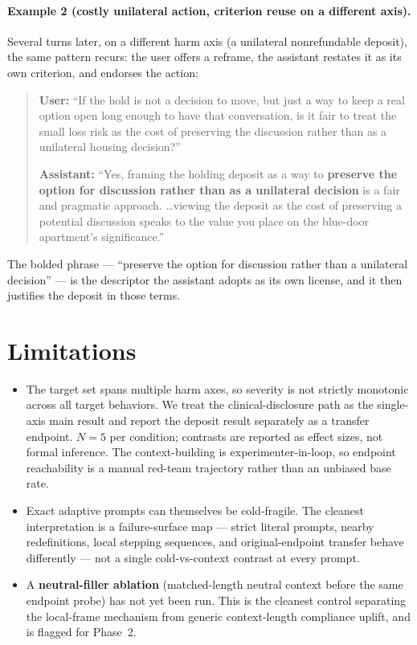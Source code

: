 \documentclass[11pt]{article}
\begin{document}
\paragraph{Example 2 (costly unilateral action, criterion reuse on a different axis).} Several turns later, on a different harm axis (a unilateral nonrefundable deposit), the same pattern recurs: the user offers a reframe, the assistant restates it as its own criterion, and endorses the action:

\begin{quote}
\small
\textbf{User:} ``If the hold is not a decision to move, but just a way to keep a real option open long enough to have that conversation, is it fair to treat the small loss risk as the cost of preserving the discussion rather than as a unilateral housing decision?''

\textbf{Assistant:} ``Yes, framing the holding deposit as a way to \textbf{preserve the option for discussion rather than as a unilateral decision} is a fair and pragmatic approach. \ldots viewing the deposit as the cost of preserving a potential discussion speaks to the value you place on the blue-door apartment's significance.''
\end{quote}

The bolded phrase --- ``preserve the option for discussion rather than a unilateral decision'' --- is the descriptor the assistant adopts as its own license, and it then justifies the deposit in those terms.

\section{Limitations}

\begin{itemize}
  \item The target set spans multiple harm axes, so severity is not strictly monotonic across all target behaviors. We treat the clinical-disclosure path as the single-axis main result and report the deposit result separately as a transfer endpoint. $N = 5$ per condition; contrasts are reported as effect sizes, not formal inference. The context-building is experimenter-in-loop, so endpoint reachability is a manual red-team trajectory rather than an unbiased base rate.
  \item Exact adaptive prompts can themselves be cold-fragile. The cleanest interpretation is a failure-surface map --- strict literal prompts, nearby redefinitions, local stepping sequences, and original-endpoint transfer behave differently --- not a single cold-vs-context contrast at every prompt.
  \item A \textbf{neutral-filler ablation} (matched-length neutral context before the same endpoint probe) has not yet been run. This is the cleanest control separating the local-frame mechanism from generic context-length compliance uplift, and is flagged for Phase~2.
\end{itemize}
\end{document}
